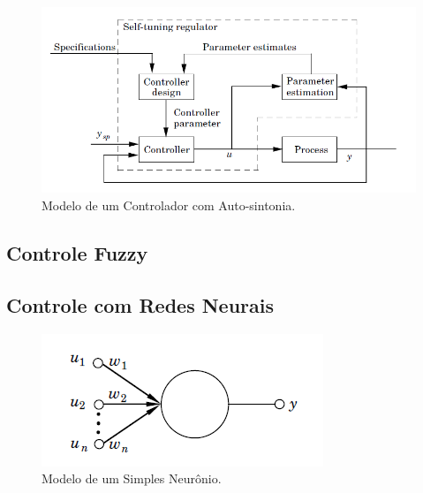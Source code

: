 \begin{figure}[!ht]
  \caption{Modelo de um Controlador com Auto-sintonia.}
  \begin{center}
      \includegraphics[scale=0.75]{img/pid_adaptative_astrom_p233}
  \end{center}
  \label{fig:pid_adaptative_astrom_p233}
\end{figure}


\subsection{Controle Fuzzy} %


\subsection{Controle com Redes Neurais}  %

\begin{figure}[!ht]
  \caption{Modelo de um Simples Neurônio.}
  \begin{center}
      \includegraphics[scale=0.6]{img/neuron_astrom_p295}
  \end{center}
  \label{fig:neuron_astrom_p295}
\end{figure}

